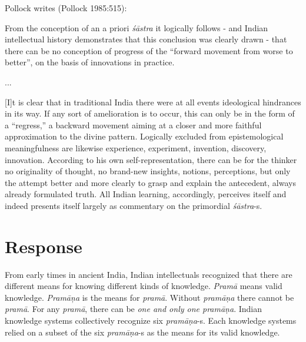 Pollock writes (Pollock 1985:515):
\begin{myquote}
From the conception of an a priori {\sl śāstra} it logically follows - and Indian intellectual history demonstrates that this conclusion was clearly drawn - that there can be no conception of progress of the ``forward movement from worse to better'', on the basis of innovations in practice.

...

\newpage

[I]t is clear that in traditional India there were at all events ideological hindrances in its way. If any sort of amelioration is to occur, this can only be in the form of a ``regress,'' a backward movement aiming at a closer and more faithful approximation to the divine pattern. Logically excluded from epistemological meaningfulness are likewise experience, experiment, invention, discovery, innovation.  According to his own self-representation, there can be for the thinker no originality of thought, no brand-new insights, notions, perceptions, but only the attempt better and more clearly to grasp and explain the antecedent, always already formulated truth. All Indian learning, accordingly, perceives itself and indeed presents itself largely as commentary on the primordial {\sl śāstra}-s.
\end{myquote}

\section*{Response}

From early times in ancient India, Indian intellectuals recognized that there are different means for knowing different kinds of knowledge. {\sl Pramā} means valid knowledge.  {\sl Pramāņa} is the means for {\sl pramā}.  Without {\sl pramāṇa} there cannot be {\sl pramā}.  For any {\sl pramā}, there can be {\sl one and only one pramāṇa}.  Indian knowledge systems collectively recognize six {\sl pramāṇa}-s. Each knowledge systems relied on a subset of the six {\sl pramāṇa}-s as the means for its valid knowledge.

